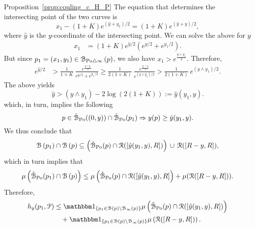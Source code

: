 \begin{proofof}{Proposition~\ref{prop:couling_c_H_P}}
The equation that determines the intersecting point of the two curves is
\[
	x_1 - (1+K)e^{(\hat{y} + y_1)/2}= (1+K) e^{(\hat{y} + y)/2},
\]
where $\hat{y}$ is the $y$-coordinate of the intersecting point. 
We can solve the above for $\hat{y}$  
\begin{equation*} 
\begin{split}
x_1 &=(1+K) e^{\hat{y}/2} \left( e^{y/2} + e^{y_1/2} \right).
\end{split}
\end{equation*}
But since $p_1=(x_1,y_1)  \in {\mathcal B}_{{\mathrm{Po}} \bigtriangleup \infty}\left(p\right)$, we also have $x_1 > e^{\frac{y + y_1}{2}}$. Therefore, 
\begin{equation}\label{eq:bounds_fat_ball_points}
\begin{split}
 e^{\hat{y}/2}& > \frac{1}{1+K}~\frac{e^{\frac{y + y_1}{2}}}{ e^{y/2}+ e^{y_1/2}} \geq 
\frac{1}{2(1+K)}~\frac{e^{\frac{y_1 + y}{2}}}{ e^{(y \vee y_1) /2}} 
> \frac{1}{2(1 + K)} ~ e^{(y \wedge y_1)/2}. 
 \end{split}
\end{equation}
The above yields
\begin{equation} \label{eq:to_use_I}
\hat{y} > (y \wedge y_1) - 2\log(2(1+K)) := \hat{y}(y_1, y). 
\end{equation}
which, in turn, implies the following 
\begin{equation}\label{eq:intersex_approx}
	p \in \check{{\mathcal B}}_{{\mathrm{Po}}}((0,y))\cap \check{{\mathcal B}}_{{\mathrm{Po}}}(p_1) \Rightarrow y(p) \ge \hat{y}(y_1,y).
\end{equation}
We thus conclude that 
\[ 
	{\mathcal B}\left(p_1\right) \cap {\mathcal B}\left(p\right) \subseteq \left(\check{{\mathcal B}}_{{\mathrm{Po}}}(p) \cap {\mathcal R}([\hat{y}(y_1,y), R])\right)
	\, \cup \, {\mathcal R} ([R - y,R]),
\]
which in turn implies that
\[
	\mu \left( \check{{\mathcal B}}_{{\mathrm{Po}}}(p_1) \cap {\mathcal B}\left(p\right) \right) \leq 
	\mu\left( \check{{\mathcal B}}_{{\mathrm{Po}}}(p) \cap  {\mathcal R}([\hat{y}(y_1,y), R]\right) + 
	\mu ({\mathcal R} ([R - y, R]) ).
\]
Therefore, 
\begin{align*} 
	h_y(p_1, \Pcal) &\leq \ind{p_1 \in \BallHyp{p}\setminus \BallPo{p}} 
    	\mu  \left( \FatBallHyp{p} \cap  \Rcal([\hat{y}(y_1,y), R])\right)
        \\
	&\hspace{10pt}+ \ind{p_1 \in \BallHyp{p}\setminus \BallPo{p}}
    	\mu  \left( \Rcal ([R - y, R]) \right).
\end{align*}




\end{proofof}
